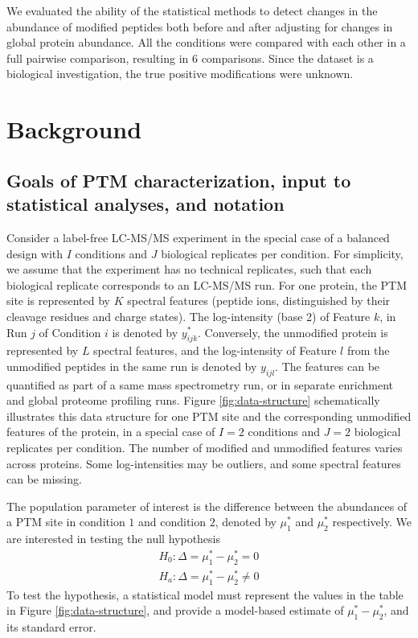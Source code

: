 \documentclass[mcp]{article}
\numberwithin{table}{section}
\begin{document}
\medskip {} We evaluated the ability of the statistical methods to detect  changes in the abundance of modified peptides both before and after adjusting for changes in global protein abundance. All the conditions were compared with each other in a full pairwise comparison, resulting in 6 comparisons. Since the dataset is a biological investigation, the true positive modifications were unknown.

\section*{Background}

\subsection*{Goals of PTM characterization, input to statistical analyses, and notation}

Consider a label-free LC-MS/MS experiment in the special case of a balanced design with $I$ conditions and $J$ biological replicates per condition. For simplicity, we assume that the experiment has no technical replicates, such that each biological replicate corresponds to an LC-MS/MS run.  For one protein, the PTM site is represented by $K$ spectral features (peptide ions, distinguished by their cleavage residues and charge states). The log-intensity (base 2) of Feature $k$, in Run $j$ of Condition $i$ is denoted by $y_{ijk}^{\ast}$. Conversely, the unmodified protein is represented by $L$ spectral features, and the log-intensity of Feature $l$ from the unmodified peptides in the same run is denoted by $y_{ijl}$. The features can be quantified as part of a same mass spectrometry run, or in separate enrichment and global proteome profiling runs.
Figure \ref{fig:data-structure} schematically illustrates this data structure for one PTM site and the corresponding unmodified features of the protein, in a special case of $I=2$ conditions and $J=2$ biological replicates per condition. The number of modified and unmodified features varies across proteins. Some log-intensities may be outliers, and some spectral features can be missing. 

The population parameter of interest is the difference between the abundances of a PTM site in condition $1$ and condition $2$, denoted by $\mu_1^{\ast}$ and $\mu_2^{\ast}$ respectively. We are interested in testing the null hypothesis
\begin{equation}
\begin{aligned}
H_{0}: \Delta = \mu_{1}^{\ast} - \mu_{2}^{\ast} = 0 \\
H_{a}: \Delta = \mu_{1}^{\ast} - \mu_{2}^{\ast} \neq 0
\end{aligned}
\label{eq:conv_null_hyp}
\end{equation}
To test the hypothesis, a statistical model must represent the values in the table in Figure \ref{fig:data-structure}, and provide a model-based estimate of $\mu_{1}^{\ast} - \mu_{2}^{\ast}$, and its standard error.
\end{document}
